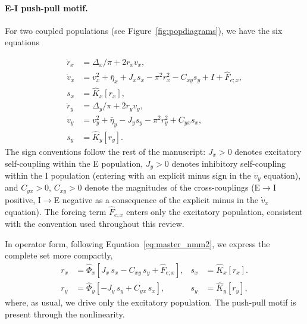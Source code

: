 \documentclass[12pt]{article}
\numberwithin{equation}{section}
\newcommand{\rev}[1]{\begingroup\color{navyblue}#1\endgroup}
\begin{document}
\paragraph{E-I push-pull motif.}  For two coupled populations (see Figure~\ref{fig:popdiagrams}), we have the six equations

\rev{\begin{equation}
\begin{aligned}
\dot r_x &= \Delta_x/\pi + 2 r_x v_x, \\
\dot v_x &= v_x^2 + \bar\eta_x + J_x s_x - \pi^2 r_x^2 - C_{xy} s_y + I +\hat F_{e;x}, \\
s_x &= \hat K_x[r_x], \\
\dot r_y &= \Delta_y/\pi + 2 r_y v_y, \\
\dot v_y &= v_y^2 + \bar\eta_y - J_y s_y - \pi^2 r_y^2 + C_{yx} s_x, \\
s_y &= \hat K_y[r_y].
\end{aligned}
\label{eq:nmm2-EI-pushpull}
\end{equation}
The sign conventions follow the rest of the manuscript: $J_x>0$ denotes excitatory self-coupling within the E population, $J_y>0$ denotes inhibitory self-coupling within the I population (entering with an explicit minus sign in the $\dot v_y$ equation), and $C_{yx}>0$, $C_{xy}>0$ denote the magnitudes of the cross-couplings (E$\to$I positive, I$\to$E negative as a consequence of the explicit minus in the $\dot v_x$ equation). The forcing term $\hat F_{e;x}$ enters only the excitatory population, consistent with the convention used throughout this review.}

In operator form, following Equation~\ref{eq:master_nmm2}, we express the complete set more compactly,
\begin{equation}
\begin{aligned}
     r_x &=  \hat \Phi_x [J_x\, s_x - C_{xy} \, s_y +\hat F_{e;x}], & 
 s_x &= \hat K_x [r_x]. \\
  r_y &=  \hat \Phi_y [-J_y\, s_y +  C_{yx} \, s_x ], & 
 s_y &= \hat K_y[r_y], 
\end{aligned}
\end{equation}
where, as usual, we drive only the excitatory population. The push-pull motif is present through the nonlinearity. 
\end{document}
